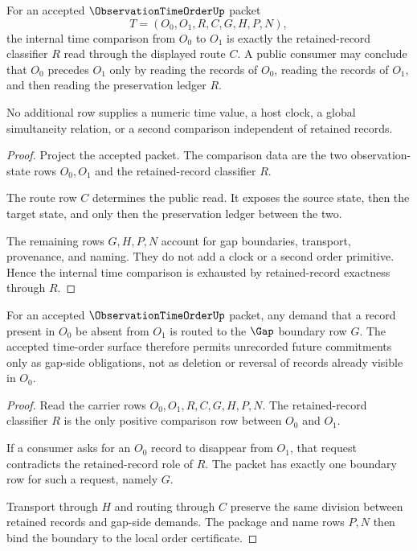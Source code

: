 \begin{theorem}
\label{thm:observation-time-order-retained-record-exactness}
For an accepted $\ObservationTimeOrderUp$ packet
$$
T=(O_0,O_1,R,C,G,H,P,N),
$$
the internal time comparison from $O_0$ to $O_1$ is exactly the retained-record classifier $R$ read through the displayed route $C$. A public consumer may conclude that $O_0$ precedes $O_1$ only by reading the records of $O_0$, reading the records of $O_1$, and then reading the preservation ledger $R$.

No additional row supplies a numeric time value, a host clock, a global simultaneity relation, or a second comparison independent of retained records.
\end{theorem}
\begin{proof}
Project the accepted packet. The comparison data are the two observation-state rows $O_0,O_1$ and the retained-record classifier $R$.

The route row $C$ determines the public read. It exposes the source state, then the target state, and only then the preservation ledger between the two.

The remaining rows $G,H,P,N$ account for gap boundaries, transport, provenance, and naming. They do not add a clock or a second order primitive. Hence the internal time comparison is exhausted by retained-record exactness through $R$.
\end{proof}

\begin{theorem}
\label{thm:observation-time-order-erasure-boundary}
For an accepted $\ObservationTimeOrderUp$ packet, any demand that a record present in $O_0$ be absent from $O_1$ is routed to the $\Gap$ boundary row $G$. The accepted time-order surface therefore permits unrecorded future commitments only as gap-side obligations, not as deletion or reversal of records already visible in $O_0$.
\end{theorem}
\begin{proof}
Read the carrier rows $O_0,O_1,R,C,G,H,P,N$. The retained-record classifier $R$ is the only positive comparison row between $O_0$ and $O_1$.

If a consumer asks for an $O_0$ record to disappear from $O_1$, that request contradicts the retained-record role of $R$. The packet has exactly one boundary row for such a request, namely $G$.

Transport through $H$ and routing through $C$ preserve the same division between retained records and gap-side demands. The package and name rows $P,N$ then bind the boundary to the local order certificate.
\end{proof}

